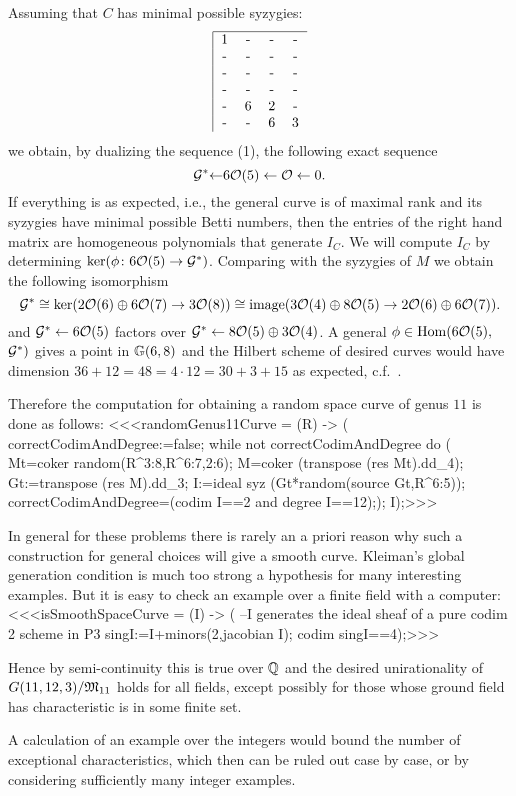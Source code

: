 Assuming that $C$ has minimal possible syzygies:
$$
\begin{tabular}{|cccc}\hline
1 & - & - & - \cr
-&-&-&-\cr
-&-&-&-\cr
-&-&-&-\cr
-&6&2&-\cr
-&-&6&3\cr
\end{tabular}
$$
we obtain, by dualizing the sequence (1), the following exact sequence
$$ {\mathcal G}^* {\leftarrow  } 6{\mathcal O}(5) \leftarrow {\mathcal O} \leftarrow 0.$$
If everything is as expected, 
i.e., the general curve is of maximal rank and its syzygies have minimal possible
Betti numbers, then the entries of the right hand matrix are
homogeneous polynomials that generate $I_C$. 
We will compute $I_C$ by determining $ \ker (\phi \colon 6{\mathcal O}(5) \to {\mathcal G}^*)$.
Comparing with the syzygies of $M$ we obtain the following isomorphism
$${\mathcal G}^* \cong \ker(2{\mathcal O}(6)\oplus6{\mathcal O}(7) \to 3{\mathcal O}(8)) \cong 
{\rm{image}}(3{\mathcal O}(4)\oplus8{\mathcal O}(5) \to 2{\mathcal O}(6)\oplus6{\mathcal O}(7)).$$
and ${\mathcal G}^* \leftarrow 6{\mathcal O}(5)$ factors over ${\mathcal G}^* \leftarrow 8{\mathcal O}(5)\oplus3{\mathcal O}(4)$.
A general $\phi \in \operatorname{Hom}(6{\mathcal O}(5),$ ${\mathcal G}^*)$ gives a point in ${\mathbb G}(6,8)$
and the Hilbert scheme of  desired curves would have dimension 
$36+12=48=4\cdot12=30+3+15$ as expected, c.f.~\cite{CO:Ha2}.

\medskip
Therefore the computation for obtaining a random space curve of genus $11$ 
is done as follows:
<<<randomGenus11Curve = (R) -> (
     correctCodimAndDegree:=false;
     while not correctCodimAndDegree do (
          Mt=coker random(R^{3:8},R^{6:7,2:6});
          M=coker (transpose (res Mt).dd_4);
          Gt:=transpose (res M).dd_3;
          I:=ideal syz (Gt*random(source Gt,R^{6:5}));
          correctCodimAndDegree=(codim I==2 and degree I==12););
     I);>>>

\medskip
In general for these problems there is rarely an a priori reason
why such a construction for general choices will give a smooth curve. 
Kleiman's global generation condition \cite{CO:Klei} is much too
strong a hypothesis for many interesting examples. 
But it is easy to check an example over a finite field with a computer:
<<<isSmoothSpaceCurve = (I) -> (
     --I generates the ideal sheaf of a pure codim 2 scheme in P3
     singI:=I+minors(2,jacobian I);
     codim singI==4);>>>

Hence by semi-continuity this is true over ${\mathbb Q}$ and the
desired unirationality of $G(11,12,3)/\mathfrak M_{11}$ holds for all fields,
except possibly for those whose ground field has characteristic is in some finite set.

A calculation of an example over the integers
would bound the number of exceptional characteristics, 
which then can be ruled out case by case, 
or by considering sufficiently many integer examples.

